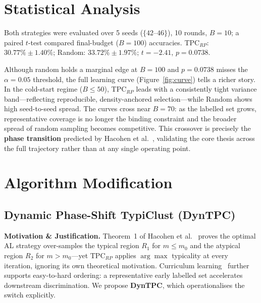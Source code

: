 \documentclass[11pt, twocolumn]{article}
\begin{document}
\section{Statistical Analysis}
\label{sec:stat}

Both strategies were evaluated over 5 seeds ($\{42\text{–}46\}$), 10 rounds,
$B{=}10$; a paired $t$-test compared final-budget ($B{=}100$) accuracies.
TPC$_{RP}$: $30.77\%\pm1.40\%$; Random: $33.72\%\pm1.97\%$;
$t{=}{-}2.41$, $p{=}0.0738$.

Although random holds a marginal edge at $B{=}100$ and $p{=}0.0738$ misses
the $\alpha{=}0.05$ threshold, the full learning curve (Figure~\ref{fig:curve})
tells a richer story.
In the cold-start regime ($B{\leq}50$), TPC$_{RP}$ leads with a consistently
tight variance band—reflecting reproducible, density-anchored selection—while
Random shows high seed-to-seed spread.
The curves cross near $B{=}70$: as the labelled set grows, representative
coverage is no longer the binding constraint and the broader spread of random
sampling becomes competitive.
This crossover is precisely the \textbf{phase transition} predicted by
Hacohen et al.~\cite{hacohen2022}, validating the core thesis across the full
trajectory rather than at any single operating point.

\section{Algorithm Modification}

\subsection*{Dynamic Phase-Shift TypiClust (DynTPC)}

\textbf{Motivation \& Justification.}
Theorem~1 of Hacohen et al.~\cite{hacohen2022} proves the optimal AL strategy
over-samples the typical region $R_1$ for $m\leq m_0$ and the atypical region
$R_2$ for $m>m_0$—yet TPC$_{RP}$ applies $\arg\max$ typicality at every
iteration, ignoring its own theoretical motivation.
Curriculum learning~\cite{bengio2009curriculum} further supports easy-to-hard
ordering: a representative early labelled set accelerates downstream
discrimination.
We propose \textbf{DynTPC}, which operationalises the switch explicitly.
\end{document}
